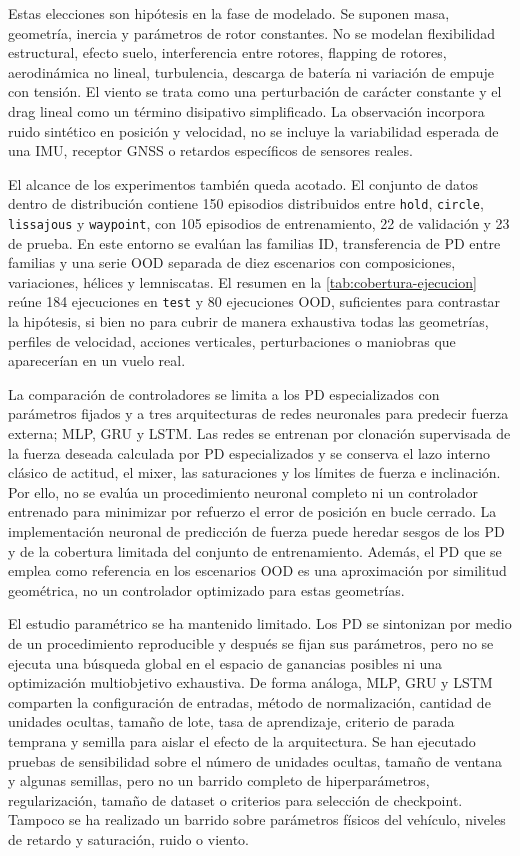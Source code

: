 Estas elecciones son hipótesis en la fase de modelado. Se suponen masa, geometría, inercia y parámetros de rotor constantes. No se modelan flexibilidad estructural, efecto suelo, interferencia entre rotores, flapping de rotores, aerodinámica no lineal, turbulencia, descarga de batería ni variación de empuje con tensión. El viento se trata como una perturbación de carácter constante y el drag lineal como un término disipativo
simplificado. La observación incorpora ruido sintético en posición y velocidad, no se incluye la variabilidad esperada de una IMU, receptor GNSS o retardos
específicos de sensores reales.

El alcance de los experimentos también queda acotado. El conjunto de datos
dentro de distribución contiene 150 episodios distribuidos entre \texttt{hold}, \texttt{circle}, \texttt{lissajous} y \texttt{waypoint}, con 105 episodios de
entrenamiento, 22 de validación y 23 de prueba. En este entorno se evalúan las
familias ID, transferencia de PD entre familias y una serie OOD separada de diez
escenarios con composiciones, variaciones, hélices y lemniscatas. El resumen en la \autoref{tab:cobertura-ejecucion} reúne 184 ejecuciones en \texttt{test} y 80
ejecuciones OOD, suficientes para contrastar la hipótesis, si bien no para cubrir
de manera exhaustiva todas las geometrías, perfiles de velocidad, acciones verticales, perturbaciones
o maniobras que aparecerían en un vuelo real.

La comparación de controladores se limita a los PD especializados con parámetros
fijados y a tres arquitecturas de redes neuronales para predecir fuerza externa;
MLP, GRU y LSTM. Las redes se entrenan por clonación supervisada de la fuerza deseada
calculada por PD especializados y se conserva el lazo interno clásico de actitud, el mixer,
las saturaciones y los límites de fuerza e inclinación. Por ello, no se evalúa un procedimiento
neuronal completo ni un controlador entrenado para minimizar por refuerzo el error de posición
en bucle cerrado. La implementación neuronal de predicción de fuerza puede heredar sesgos de los PD  y
de la cobertura limitada del conjunto de entrenamiento. Además, el PD que se emplea como referencia
en los escenarios OOD es una aproximación por similitud geométrica, no un controlador optimizado
para estas geometrías.

El estudio paramétrico se ha mantenido limitado. Los PD se sintonizan por medio de
un procedimiento reproducible y después se fijan sus parámetros, pero no se ejecuta
una búsqueda global en el espacio de ganancias posibles ni una optimización multiobjetivo
exhaustiva. De forma análoga, MLP, GRU y LSTM comparten la configuración de entradas, método de
normalización, cantidad de unidades ocultas, tamaño de lote, tasa de aprendizaje, criterio de
parada temprana y semilla para aislar el efecto de la arquitectura. Se han ejecutado pruebas de
sensibilidad sobre el número de unidades ocultas, tamaño de ventana y algunas semillas, pero no
un barrido completo de hiperparámetros, regularización, tamaño de dataset o criterios para selección
de checkpoint. Tampoco se ha realizado un barrido sobre parámetros físicos del vehículo, niveles de
retardo y saturación, ruido o viento.

